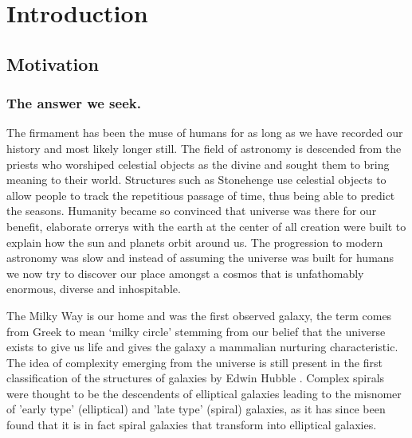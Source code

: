 
\chapter{Introduction} %
\label{Chapter:Intro}

\section{Motivation}
\label{sec:Motivation}

\subsection{The answer we seek.}
The firmament has been the muse of humans for as long as we have recorded our history and most likely longer still. The field of astronomy is descended from the priests who worshiped celestial objects as the divine and sought them to bring meaning to their world. Structures such as Stonehenge use celestial objects to allow people to track the repetitious passage of time, thus being able to predict the seasons. Humanity became so convinced that universe was there for our benefit, elaborate orrerys with the earth at the center of all creation were built to explain how the sun and planets orbit around us. The progression to modern astronomy was slow and instead of assuming the universe was built for humans we now try to discover our place amongst a cosmos that is unfathomably enormous, diverse and inhospitable. 

The Milky Way is our home and was the first observed galaxy, the term comes from Greek to mean `milky circle' stemming from our belief that the universe exists to give us life and gives the galaxy a mammalian nurturing characteristic. The idea of complexity emerging from the universe is still present in the first classification of the structures of galaxies by Edwin Hubble \citep{Hubble1926Extra-galacticNebulae.,Hubble1927TheNebulae}. Complex spirals were thought to be the descendents of elliptical galaxies leading to the misnomer of 'early type' (elliptical) and 'late type' (spiral) galaxies, as it has since been found that it is in fact spiral galaxies that transform into elliptical galaxies.

